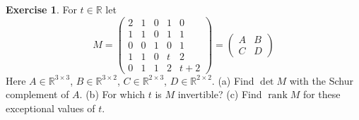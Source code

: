 \documentclass[12pt]{article}
\newcommand{\R}{\mathbb R}
\DeclareMathOperator{\rank}{rank}
\theoremstyle{definition}
\newtheorem{exercise}{Exercise}
\begin{document}
\begin{exercise}\label{r5d-ex-schur-numeric}
For \(t\in\R\) let
\[
M=\left(\begin{array}{ccc|cc}2&1&0&1&0\\1&1&0&1&1\\0&0&1&0&1\\\hline1&1&0&t&2\\0&1&1&2&t+2\end{array}\right)
=\begin{pmatrix}A&B\\C&D\end{pmatrix}
\]
Here \(A\in\R^{3\times3}\), \(B\in\R^{3\times2}\), \(C\in\R^{2\times3}\), \(D\in\R^{2\times2}\).
(a) Find \(\det M\) with the Schur complement of \(A\). (b) For which \(t\) is \(M\) invertible?
(c) Find \(\rank M\) for these exceptional values of \(t\).
\end{exercise}
\end{document}
